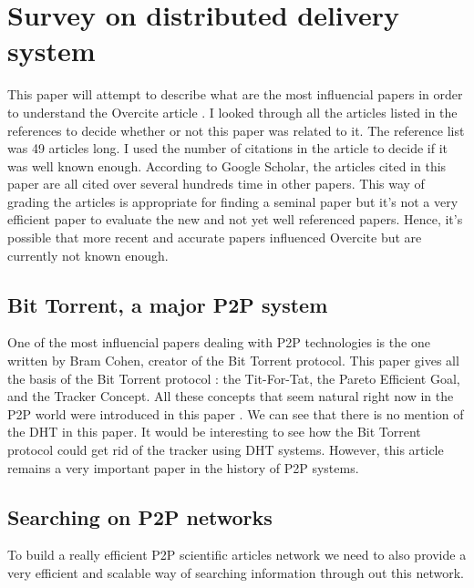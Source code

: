 \section{Survey on distributed delivery system}


This paper will attempt to describe what are the most influencial papers in order to
understand the Overcite article
\cite{overcite}. I looked through all the articles listed in the references to decide whether 
or not this paper was related to it. The reference list was 49 articles long. I used the 
number of citations in the article to decide if it was well known enough.
According to Google Scholar, the articles cited in this paper are all cited over several 
hundreds time in other papers. This way of grading the articles is appropriate 
for finding a seminal paper but 
it's not a very efficient paper to evaluate the new and not yet well referenced papers.
Hence, it's possible that more recent and accurate papers influenced Overcite but are 
currently not known enough.

\subsection{Bit Torrent, a major P2P system}

One of the most influencial papers dealing with P2P technologies is the one written by Bram 
Cohen, creator of the Bit Torrent protocol. This paper gives all the basis of the Bit Torrent protocol :
the Tit-For-Tat, the Pareto Efficient Goal, and the Tracker Concept. All these concepts that seem natural
right now in the P2P world were introduced in this paper \cite{Cohen03incentivesbuild}.
We can see that there is no mention of the DHT in this paper. It would be interesting
to see how the Bit Torrent protocol could get rid of the tracker using DHT systems.
However, this article remains a very important paper in the history of P2P systems.

\subsection{Searching on P2P networks}

To build a really efficient P2P scientific articles network we need to also
provide a very efficient and scalable way of searching information through out this network.

